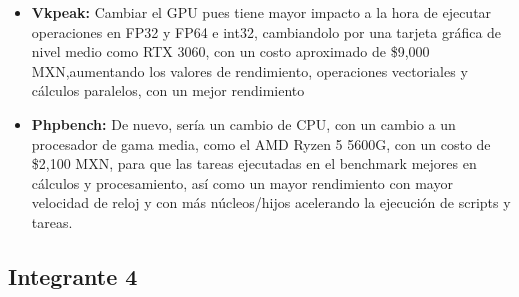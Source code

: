 \documentclass[12pt]{article}
\begin{document}
\begin{enumerate}[label=(\arabic{section}.\arabic{subsection}.\arabic{enumi})]
\begin{itemize}
    	\item \textbf{Vkpeak:} Cambiar el GPU pues tiene mayor impacto a la hora de ejecutar operaciones en FP32 y FP64 e int32, cambiandolo por una tarjeta gráfica de nivel medio como RTX 3060, con un costo aproximado de \$9,000 MXN,aumentando los valores de rendimiento, operaciones vectoriales y cálculos paralelos, con un mejor rendimiento
    	
    	\item \textbf{Phpbench:} De nuevo, sería un cambio de CPU, con un cambio a un procesador de gama media, como el AMD Ryzen 5 5600G, con un costo de  \$2,100 MXN, para que las tareas ejecutadas en el benchmark mejores en cálculos y procesamiento, así como un mayor rendimiento con mayor velocidad de reloj y con más núcleos/hijos acelerando la ejecución de scripts y tareas.
    	
    \end{itemize}

\end{enumerate}

\subsection{Integrante 4}
\end{document}
